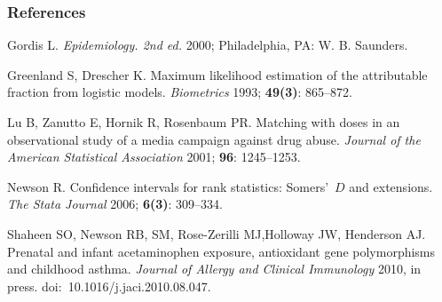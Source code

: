 \documentclass[11pt]{beamer}
\begin{document}
\begin{frame}
\frametitle{References}


{\scriptsize

\begin{thebibliography}{10}

Gordis L.
\textsl{Epidemiology. 2nd ed.} 2000; Philadelphia, PA: W. B. Saunders.

Greenland S, Drescher K.
Maximum likelihood estimation of the attributable fraction from logistic models.
\textsl{Biometrics} 1993; \textbf{49(3)}: 865--872.

Lu B, Zanutto E, Hornik R, Rosenbaum PR.
Matching with doses in an observational study of a media campaign against drug abuse.
\textsl{Journal of the American Statistical Association} 2001; \textbf{96}: 1245--1253.

Newson R.
Confidence intervals for rank statistics: Somers'~$D$ and extensions.
\textsl{The Stata Journal} 2006; \textbf{6(3)}: 309--334.

Shaheen SO, Newson RB, SM, Rose-Zerilli MJ,Holloway JW, Henderson AJ.
Prenatal and infant acetaminophen exposure, antioxidant gene polymorphisms and childhood asthma.
\textsl{Journal of Allergy and Clinical Immunology} 2010, in press.
doi:~10.1016/j.jaci.2010.08.047.

\end{thebibliography}

}

\bigskip

\end{frame}
\end{document}
